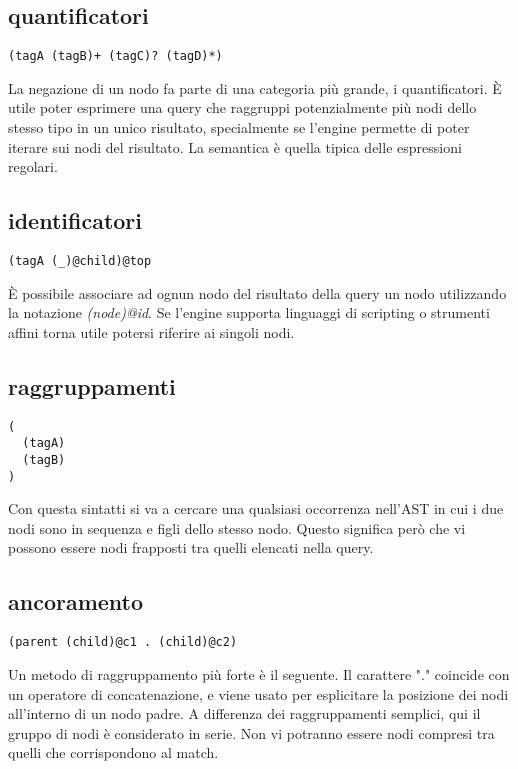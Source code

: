 \subsection{quantificatori}

\begin{lstlisting}
(tagA (tagB)+ (tagC)? (tagD)*)
\end{lstlisting}

La negazione di un nodo fa parte di una categoria pi\`u grande, i quantificatori.
\`E utile poter esprimere una query che raggruppi potenzialmente pi\`u nodi dello stesso tipo in un unico risultato, specialmente se l'engine permette di poter iterare sui nodi del risultato.
La semantica \`e quella tipica delle espressioni regolari.

\subsection{identificatori}

\begin{lstlisting}
(tagA (_)@child)@top
\end{lstlisting}

\`E possibile associare ad ognun nodo del risultato della query un nodo utilizzando la notazione \emph{(node)@id}.
Se l'engine supporta linguaggi di scripting o strumenti affini torna utile potersi riferire ai singoli nodi.

\subsection{raggruppamenti}

\begin{lstlisting}
(
  (tagA)
  (tagB)
)
\end{lstlisting}

Con questa sintatti si va a cercare una qualsiasi occorrenza nell'AST in cui i due nodi sono in sequenza e figli dello stesso nodo.
Questo significa per\`o che vi possono essere nodi frapposti tra quelli elencati nella query.

\subsection{ancoramento}

\begin{lstlisting}
(parent (child)@c1 . (child)@c2)
\end{lstlisting}

Un metodo di raggruppamento pi\`u forte \`e il seguente.
Il carattere "." coincide con un operatore di concatenazione, e viene usato per esplicitare la posizione dei nodi all'interno di un nodo padre.
A differenza dei raggruppamenti semplici, qui il gruppo di nodi \`e considerato in serie.
Non vi potranno essere nodi compresi tra quelli che corrispondono al match.

